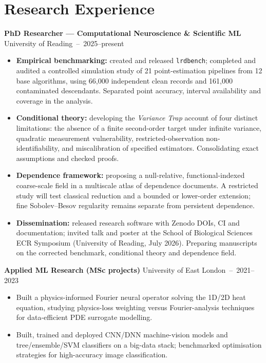 \documentclass[10pt,a4paper]{article}
\newcommand{\entry}[2]{{\textbf{#1}} \hfill {\small\color{muted}#2}\\[1pt]}
\begin{document}
\section{Research Experience}
\entry{PhD Researcher --- Computational Neuroscience \& Scientific ML}{University of Reading \,--\, 2025--present}
\begin{itemize}[leftmargin=1.3em,itemsep=1.5pt,topsep=2pt]
  \item \textbf{Empirical benchmarking:} created and released \texttt{lrdbench}; completed and audited a controlled simulation study of 21 point-estimation pipelines from 12 base algorithms, using 66,000 independent clean records and 161,000 contaminated descendants. Separated point accuracy, interval availability and coverage in the analysis.
  \item \textbf{Conditional theory:} developing the \emph{Variance Trap} account of four distinct limitations: the absence of a finite second-order target under infinite variance, quadratic measurement vulnerability, restricted-observation non-identifiability, and miscalibration of specified estimators. Consolidating exact assumptions and checked proofs.
  \item \textbf{Dependence framework:} proposing a null-relative, functional-indexed coarse-scale field in a multiscale atlas of dependence documents. A restricted study will test classical reduction and a bounded or lower-order extension; fine Sobolev--Besov regularity remains separate from persistent dependence.
  \item \textbf{Dissemination:} released research software with Zenodo DOIs, CI and documentation; invited talk and poster at the School of Biological Sciences ECR Symposium (University of Reading, July 2026). Preparing manuscripts on the corrected benchmark, conditional theory and dependence field.
\end{itemize}

\newpage
\entry{Applied ML Research (MSc projects)}{University of East London \,--\, 2021--2023}
\begin{itemize}[leftmargin=1.3em,itemsep=1.5pt,topsep=2pt]
  \item Built a physics-informed Fourier neural operator solving the 1D/2D heat equation, studying physics-loss weighting versus Fourier-analysis techniques for data-efficient PDE surrogate modelling.
  \item Built, trained and deployed CNN/DNN machine-vision models and tree/ensemble/SVM classifiers on a big-data stack; benchmarked optimisation strategies for high-accuracy image classification.
\end{itemize}
\end{document}
